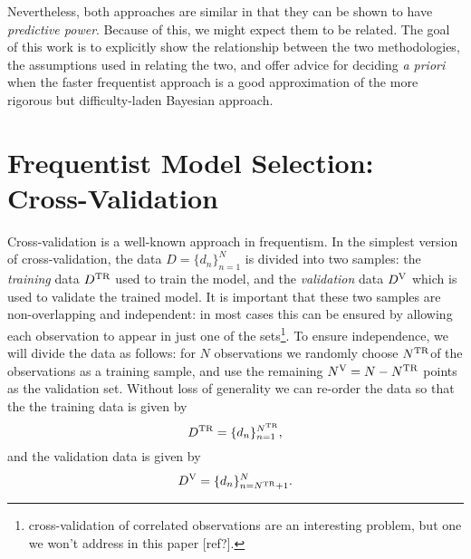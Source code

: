 \documentclass[12pt]{article}
\newcommand{\comment}[1]{{\color{red} [#1]}}
\newcommand{\Dtr}{\ensuremath{D^{\rm TR}}}
\newcommand{\Dva}{\ensuremath{D^{\rm V}}}
\newcommand{\Ntr}{\ensuremath{N^{\rm TR}}}
\newcommand{\Nva}{\ensuremath{N^{\rm V}}}
\begin{document}
Nevertheless, both approaches are similar in that they can be shown to
have {\it predictive power}.  Because of this, we might expect them to
be related.  The goal of this work is to explicitly show the relationship
between the two methodologies, the assumptions used in relating the two,
and offer advice for deciding {\it a priori} when the faster frequentist
approach is a good approximation of the more rigorous but difficulty-laden
Bayesian approach.

\section{Frequentist Model Selection: Cross-Validation}
Cross-validation is a well-known approach in frequentism.  In the simplest
version of cross-validation, the data $D = \{d_n\}_{n=1}^N$
is divided into two samples:
the {\it training} data \Dtr{} used to train the model, and the
{\it validation} data \Dva{} which is used to validate the trained
model. It is important that these two samples are
non-overlapping and independent: in most cases this can be ensured by
allowing each observation to appear in just one of the sets\footnote{
 cross-validation of correlated observations are
 an interesting problem, but one we won't address in this paper
 \comment{ref?}.}.
To ensure independence, we will divide the data as follows: for $N$
observations we randomly choose \Ntr of the observations
as a training sample, and use the remaining $\Nva = N - \Ntr$
points as the validation set.
Without loss of generality we can re-order the data so that the
the training data is given by
\begin{equation}
  \Dtr = \{d_n\}_{n=1}^{\Ntr},
\end{equation}
and the validation data is given by
\begin{equation}
  \Dva = \{d_n\}_{n=\Ntr+1}^{N}.
\end{equation}
\end{document}
